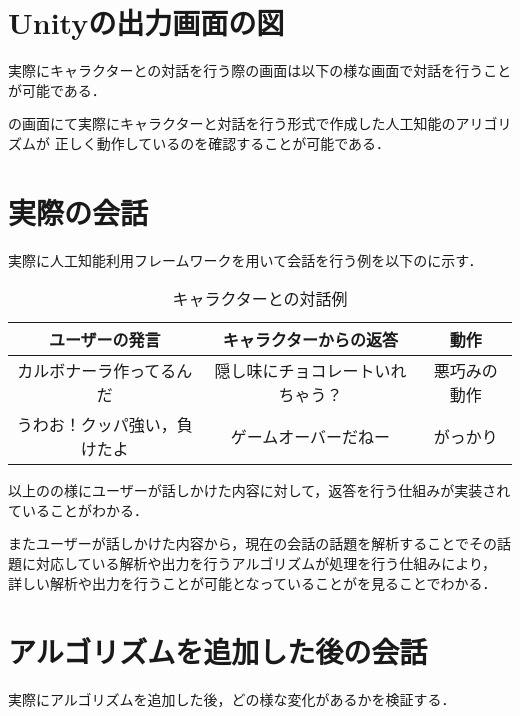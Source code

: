 
\section{Unityの出力画面の図}
実際にキャラクターとの対話を行う際の画面は以下の様な画面で対話を行うことが可能である．


の画面にて実際にキャラクターと対話を行う形式で作成した人工知能のアリゴリズムが
正しく動作しているのを確認することが可能である．


\section{実際の会話}
実際に人工知能利用フレームワークを用いて会話を行う例を以下のに示す．

\begin{table}[tbh]
	\caption{キャラクターとの対話例} \label{tab:Chat}
	\begin{center}
		\begin{tabular}[htb]{c|c|c}
		\hline
		ユーザーの発言 & キャラクターからの返答 & 動作 \\
		\hline
		カルボナーラ作ってるんだ & 隠し味にチョコレートいれちゃう？ & 悪巧みの動作 \\
		うわお！クッパ強い，負けたよ & ゲームオーバーだねー & がっかり \\
		\hline
		\end{tabular}
	\end{center}
\end{table}

以上のの様にユーザーが話しかけた内容に対して，返答を行う仕組みが実装されていることがわかる．

またユーザーが話しかけた内容から，現在の会話の話題を解析することでその話題に対応している解析や出力を行うアルゴリズムが処理を行う仕組みにより，
詳しい解析や出力を行うことが可能となっていることがを見ることでわかる．


\section{アルゴリズムを追加した後の会話}\label{sec:addAl}
実際にアルゴリズムを追加した後，どの様な変化があるかを検証する．

